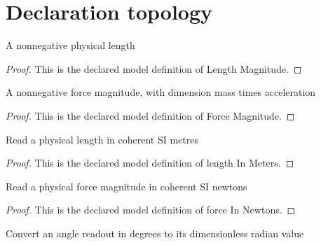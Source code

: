 \section{Declaration topology}
\begin{definition}
  \label{def:physics:phyx-mini-0709:phyxminiproblems-problemphyxmini0709-lengthmagnitude}
  A nonnegative physical length
\end{definition}
\begin{proof}
  This is the declared model definition of Length Magnitude.
\end{proof}
\begin{definition}
  \label{def:physics:phyx-mini-0709:phyxminiproblems-problemphyxmini0709-forcemagnitude}
  A nonnegative force magnitude, with dimension mass times acceleration
\end{definition}
\begin{proof}
  This is the declared model definition of Force Magnitude.
\end{proof}
\begin{definition}
  \label{def:physics:phyx-mini-0709:phyxminiproblems-problemphyxmini0709-lengthinmeters}
  Read a physical length in coherent SI metres
\end{definition}
\begin{proof}
  This is the declared model definition of length In Meters.
\end{proof}
\begin{definition}
  \label{def:physics:phyx-mini-0709:phyxminiproblems-problemphyxmini0709-forceinnewtons}
  Read a physical force magnitude in coherent SI newtons
\end{definition}
\begin{proof}
  This is the declared model definition of force In Newtons.
\end{proof}
\begin{definition}
  \label{def:physics:phyx-mini-0709:phyxminiproblems-problemphyxmini0709-angleinradiansfromdegrees}
  Convert an angle readout in degrees to its dimensionless radian value
\end{definition}

